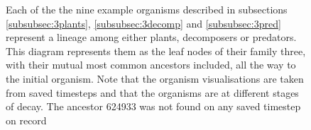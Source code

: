 \begin{figure}[ht]
    \begin{center}
    \end{center}
    \caption{
    Each of the the nine example organisms described in subsections \ref{subsubsec:3plants}, \ref{subsubsec:3decomp} and \ref{subsubsec:3pred} represent a lineage among either plants, decomposers or predators. This diagram represents them as the leaf nodes of their family three, with their mutual most common ancestors included, all the way to the initial organism. Note that the organism visualisations are taken from saved timesteps and that the organisms are at different stages of decay. The ancestor 624933 was not found on any saved timestep on record
    }
    \label{fig:familyTree}
\end{figure}

